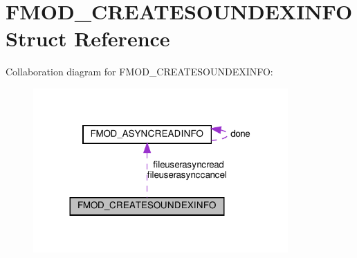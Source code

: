 \hypertarget{structFMOD__CREATESOUNDEXINFO}{}\section{F\+M\+O\+D\+\_\+\+C\+R\+E\+A\+T\+E\+S\+O\+U\+N\+D\+E\+X\+I\+N\+FO Struct Reference}
\label{structFMOD__CREATESOUNDEXINFO}


Collaboration diagram for F\+M\+O\+D\+\_\+\+C\+R\+E\+A\+T\+E\+S\+O\+U\+N\+D\+E\+X\+I\+N\+FO\+:
\nopagebreak
\begin{figure}[H]
\begin{center}
\leavevmode
\includegraphics[width=276pt]{structFMOD__CREATESOUNDEXINFO__coll__graph}
\end{center}
\end{figure}
